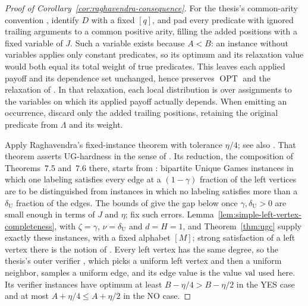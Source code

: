 \begin{proof}[Proof of Corollary~\ref{cor:raghavendra-consequence}]
For the thesis's common-arity convention
\cite[Definitions~7.2.1--7.2.2]{RaghavendraThesis09}, identify \(D\)
with a fixed \([q]\), and pad every predicate with ignored trailing
arguments to a common positive arity, filling the added positions with
a fixed variable of \(J\). Such a variable exists because \(A<B\):
an instance without variables applies only constant predicates, so its
optimum and its relaxation value would both equal its total weight of
true predicates. This leaves
each applied payoff and its dependence set unchanged, hence preserves
\(\operatorname{OPT}\) and the relaxation of
\cite[Section~4.5]{RaghavendraThesis09}.
In that relaxation, each local distribution is over assignments to
the variables on which its applied payoff actually depends.
When emitting an occurrence, discard only the added trailing positions,
retaining the original predicate from \(\Lambda\) and its weight.

Apply Raghavendra's fixed-instance theorem
\cite[Theorem~7.9]{RaghavendraThesis09} with tolerance \(\eta/4\);
see also \cite[Theorem~1.1 and Lemma~2.3]{Raghavendra08}.
That theorem asserts UG-hardness in the sense of
\cite[Definition~2.5.4]{RaghavendraThesis09}. Its reduction, the
composition of Theorems~7.5 and~7.6 there, starts from
\cite[Problem~9]{RaghavendraThesis09}: bipartite Unique Games
instances in which one labeling satisfies every edge at a
\((1-\gamma)\) fraction of the left vertices are to be distinguished
from instances in which no labeling satisfies more than a
\(\delta_{\mathrm U}\) fraction of the edges. The bounds of
\cite[Theorem~7.6]{RaghavendraThesis09} give the gap below once
\(\gamma,\delta_{\mathrm U}>0\) are small enough in terms of \(J\) and
\(\eta\); fix such errors. Lemma~\ref{lem:simple-left-vertex-completeness}, with
\(\zeta=\gamma\), \(\nu=\delta_{\mathrm U}\) and \(d=H=1\), and
Theorem~\ref{thm:ugc} supply exactly these instances, with a fixed
alphabet \([M]\); strong satisfaction of a left vertex there is the
notion of \cite[Definition~2.5.3]{RaghavendraThesis09}. Every left
vertex has the same degree, so the thesis's outer verifier
\cite[Section~7.5]{RaghavendraThesis09}, which picks
a uniform left vertex and then a uniform neighbor, samples a uniform
edge, and its edge value is the value \(\operatorname{val}\) used here. Its verifier instances have
optimum at least \(B-\eta/4>B-\eta/2\) in the YES case and at most
\(A+\eta/4\le A+\eta/2\) in the NO case.


\end{proof}
